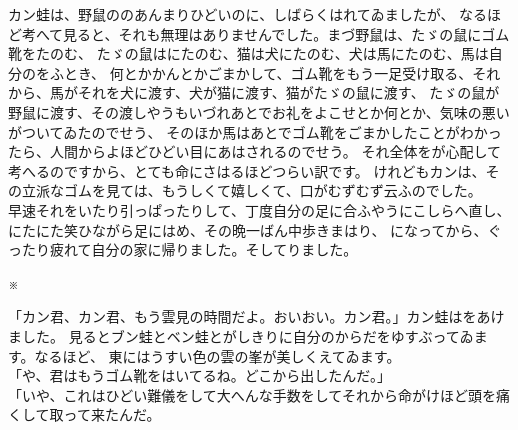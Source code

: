 \documentclass[
a4paper,
10pt,
book]
{tarticle}
\begin{document}
\newpage
\setcounter{page}{6}
\thispagestyle{fancy}
\begin{linenumbers}
\indent カン蛙は、野鼠ののあんまりひどいのに、しばらくはれてゐましたが、
なるほど考へて見ると、それも無理はありませんでした。まづ野鼠は、たゞの鼠にゴム靴をたのむ、
たゞの鼠はにたのむ、猫は犬にたのむ、犬は馬にたのむ、馬は自分のをふとき、
何とかかんとかごまかして、ゴム靴をもう一足受け取る、それから、馬がそれを犬に渡す、犬が猫に渡す、猫がたゞの鼠に渡す、
たゞの鼠が野鼠に渡す、その渡しやうもいづれあとでお礼をよこせとか何とか、気味の悪いがついてゐたのでせう、
そのほか馬はあとでゴム靴をごまかしたことがわかったら、人間からよほどひどい目にあはされるのでせう。
それ全体をが心配して考へるのですから、とても命にさはるほどつらい訳です。
けれどもカンは、その立派なゴムを見ては、もうしくて嬉しくて、口がむずむず云ふのでした。\\
\indent 早速それをいたり引っぱったりして、丁度自分の足に合ふやうにこしらへ直し、にたにた笑ひながら足にはめ、その晩一ばん中歩きまはり、
になってから、ぐったり疲れて自分の家に帰りました。そしてりました。
\end{linenumbers}

\nolinenumbers
\indent \indent \indent \indent \indent \indent \indent \indent \indent \indent ※

\begin{linenumbers}
「カン君、カン君、もう雲見の時間だよ。おいおい。カン君。」カン蛙はをあけました。
見るとブン蛙とベン蛙とがしきりに自分のからだをゆすぶってゐます。なるほど、
東にはうすい色の雲の峯が美しくえてゐます。\\
「や、君はもうゴム靴をはいてるね。どこから出したんだ。」\\
「いや、これはひどい難儀をして大へんな手数をしてそれから命がけほど頭を痛くして取って来たんだ。
\end{linenumbers}
\end{document}
